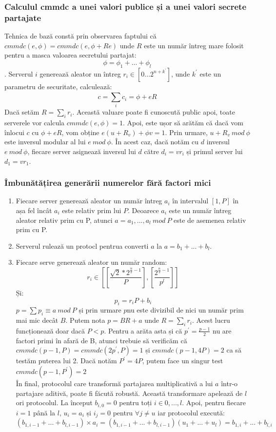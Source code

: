\documentclass[12]{article}
\begin{document}
\subsubsection{Calculul cmmdc a unei valori publice și a unei valori secrete partajate}
Tehnica de bază constă prin observarea faptului că $cmmdc(e,\phi)=cmmdc(e,\phi + Re)$ unde $R$ este un număr întreg mare folosit pentru a masca valoarea secretului partajat:
$$\phi=\phi_1+...+\phi _l$$.
Serverul $i$ generează aleator un întreg $r_i \in [0 ... 2^{n+k^{'}}]$, unde $k^{'}$ este un parametru de securitate, calculează:
$$ c = \sum_{i}^{} c_i = \phi + eR$$
Dacă setăm $R=\sum_i r_i$. Această valuare poate fi cunoscută public apoi, toate serverele vor calcula $cmmdc(e,\phi)=1$. Apoi, este ușor să arătăm că dacă vom înlocui $c$ cu $\phi + eR$, vom obține $e(u + R_v) + \phi v = 1$. Prin urmare, $u + R_v \ mod \ \phi$ este inversul modular al lui $e \ mod \ \phi$. În acest caz, dacă notăm cu $d$ inversul $e \ mod \ \phi$, fiecare server asignează inversul lui $d$ către $d_i = vr_i$ și primul server lui $d_1= vr_1$.
\subsubsection{Îmbunătățirea generării numerelor fără factori mici}
\begin{enumerate}
\item Fiecare server generează aleator un număr întreg $a_i$ în intervalul $[1,P]$ în așa fel încât $a_i$ este relativ prim lui $P$. Deoarece $a_i$ este un număr întreg aleator relativ prim cu P, atunci $a=a_1,...,a_l \ mod \ P$ este de asemenea relativ prim cu P.

\item Serverul rulează un protocl pentrua converti $a$ la $a=b_1+...+b_l$.

\item Fiecare serve generează aleator un număr random:
$$r_i \in \left[  [ \frac{\sqrt{2}* 2^{\frac{n}{2} -1} }{P}   ], [\frac{2^{\frac{n}{2}-1}}{p^l}]      \right] $$
Și:
$$ p_i=r_i P + b_i$$
$p = \sum p_i \equiv a \ mod \ P$ și prin urmare $p$nu este divizibil de nici un număr prim mai mic decât $B$. Putem nota $p=BR +a$ unde $R=\sum_{i} r_i$. Acest lucru funcționează doar dacă $P<p$. Pentru a arăta asta și că $p^{'} = \frac{p-1}{2}$ nu are factori primi în afară de B, atunci trebuie să verificăm că $cmmdc(p-1,P)=cmmdc(2p^{'},P)=1$ și $cmmdc(p-1,4P)=2$ ca să testăm puterea lui 2. Dacă notăm $P^{'}=4P$, putem face un singur test $cmmdc(p-1,P^{'})=2$\\
În final, protocolul care transformă partajarea multiplicativă a lui $a$ într-o partajare aditivă, poate fi făcută robustă. Această transformare apelează de $l$ ori protocolul. La început $b_{i,0}=0$ pentru toți $i \in {0,...,l}$. Apoi, pentru fiecare $i=1$ până la $l$, $u_i=a_i$ și $i_j=0$ pentru $\forall j \neq u$ iar protocolul execută: 
$$(b_{1,i-1}+...+b_{l,i-1}) \times a_i = (b_{1,i-1}+...+b_{l,i-1})(u_1+...+u_l)=b_{1,i}+...+b_{l,i}$$
\end{enumerate}
\end{document}
